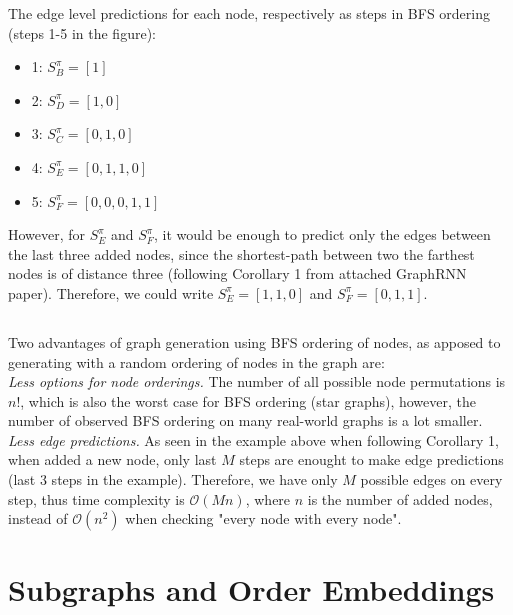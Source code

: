 \documentclass[a4paper,11pt]{article}
\begin{document}
\noindent
The edge level predictions for each node, respectively as steps in BFS ordering (steps 1-5 in the figure):
\begin{itemize}
    \item 1: $S_B^{\pi} = [1]$
    \item 2: $S_D^{\pi} = [1, 0]$
    \item 3: $S_C^{\pi} = [0, 1, 0]$
    \item 4: $S_E^{\pi} = [0, 1, 1, 0]$
    \item 5: $S_F^{\pi} = [0, 0, 0, 1, 1]$
\end{itemize}
However, for $S_E^{\pi}$ and $S_F^{\pi}$, it would be enough to predict only the edges between the last three added nodes, since the shortest-path between two the farthest nodes is of distance three (following Corollary 1 from attached GraphRNN paper).
Therefore, we could write $S_E^{\pi} = [1, 1, 0]$ and $S_F^{\pi} = [0, 1, 1]$.


\subsection{}

\noindent
Two advantages of graph generation using BFS ordering of nodes, as apposed to generating with a random ordering of nodes in the graph are:
\\
\textit{Less options for node orderings.} 
The number of all possible node permutations is $n!$, which is also the worst case for BFS ordering (star graphs), however, the number of observed BFS ordering on many real-world graphs is a lot smaller.
\\
\textit{Less edge predictions.} As seen in the example above when following Corollary 1, when added a new node, only last $M$ steps are enought to make edge predictions (last 3 steps in the example).
Therefore, we have only $M$ possible edges on every step, thus time complexity is $\mathcal{O}(M n)$, where $n$ is the number of added nodes, instead of $\mathcal{O}(n ^ 2)$ when checking "every node with every node".


\section{Subgraphs and Order Embeddings}
\end{document}
